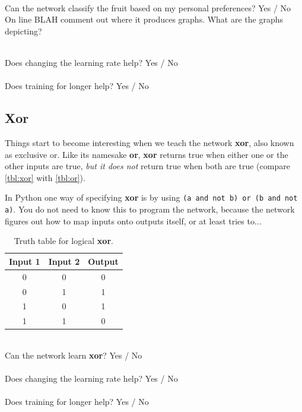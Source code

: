 \documentclass[a4paper,10pt]{article}
\begin{document}
\ \\ Can the network classify the fruit based on my personal preferences?    Yes / No   
\ \\

 On line BLAH
comment out where it produces graphs. What are the graphs depicting? 

\ \\ Does changing the learning rate help?    Yes / No   
\ \\


\ \\ Does training for longer help?    Yes / No   
\ \\



\subsection{Xor}
Things start to become interesting when we teach the network \textbf{xor}, also known as exclusive or. Like its namesake \textbf{or}, \textbf{xor} returns true when either one or the other inputs are true, \emph{but it does not} return true when both are true (compare \autoref{tbl:xor} with \autoref{tbl:or}).  


In Python one way of specifying \textbf{xor} is by using \texttt{(a and not b) or (b and not a)}. You do not need to know this to program the network, because the network figures out how to map inputs onto outputs itself, or at least tries to...

\begin{table}[ht]
 \centering
 \begin{tabular}[t]{ccc}
Input 1 & Input 2 & Output\\ \hline
0 & 0 & 0\\
0 & 1 & 1 \\
1 & 0 & 1 \\
1 & 1 & 0 \\

\end{tabular} \caption{Truth table for logical \textbf{xor}.}
 \label{tbl:xor}
\end{table}


\ \\ Can the network learn \textbf{xor}?    Yes / No   
\ \\

\ \\ Does changing the learning rate help?    Yes / No   
\ \\


\ \\ Does training for longer help?    Yes / No   
\ \\
\end{document}
